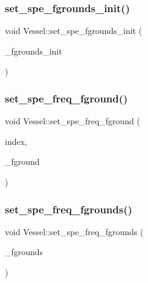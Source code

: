 \mbox{\label{class_vessel_af9e60790a9ffec12d074e33a31c5dd6c}} 
\subsubsection{\texorpdfstring{set\_spe\_fgrounds\_init()}{set\_spe\_fgrounds\_init()}}
{\footnotesize\ttfamily void Vessel\+::set\+\_\+spe\+\_\+fgrounds\+\_\+init (\begin{DoxyParamCaption}\item[{const vector$<$ \mbox{\hyperlink{classtypes_1_1_node_id}{types\+::\+Node\+Id}} $>$ \&}]{\+\_\+fgrounds\+\_\+init }\end{DoxyParamCaption})}

\mbox{\label{class_vessel_a7ca74bd3e4f3ad4085a80ba17b9a635e}} 
\subsubsection{\texorpdfstring{set\_spe\_freq\_fground()}{set\_spe\_freq\_fground()}}
{\footnotesize\ttfamily void Vessel\+::set\+\_\+spe\+\_\+freq\+\_\+fground (\begin{DoxyParamCaption}\item[{int}]{index,  }\item[{double}]{\+\_\+fground }\end{DoxyParamCaption})}

\mbox{\label{class_vessel_ad57421c8a0353286a0c9fe5e0145ef3b}} 
\subsubsection{\texorpdfstring{set\_spe\_freq\_fgrounds()}{set\_spe\_freq\_fgrounds()}}
{\footnotesize\ttfamily void Vessel\+::set\+\_\+spe\+\_\+freq\+\_\+fgrounds (\begin{DoxyParamCaption}\item[{const std\+::vector$<$ double $>$ \&}]{\+\_\+fgrounds }\end{DoxyParamCaption})}

